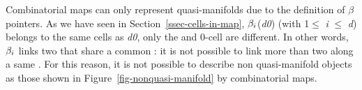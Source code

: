 Combinatorial maps can only represent quasi-manifolds due to the
definition of $\beta$ pointers. As we have seen in
Section~\ref{ssec-cells-in-map}, $\beta_{i}$(\emph{d0}) (with 1$\leq$ \emph{i} $\leq$ \emph{d})
belongs to the same cells as \emph{d0}, only the  and 0-cell are
different. In other words, $\beta_{i}$ links two  that
share a common : it is not possible to link more than two
 along a same .
%
%
For this reason, it is not possible to describe non quasi-manifold
objects as those shown in Figure~\ref{fig-nonquasi-manifold} by
combinatorial maps.
%
